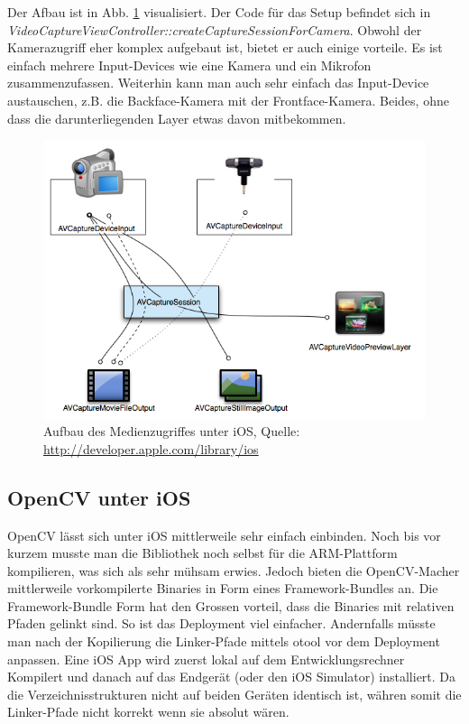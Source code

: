 Der Afbau ist in Abb. \ref{fig:ios-capture-overview} visualisiert. Der Code für das Setup befindet sich in \textit{VideoCaptureViewController::createCaptureSessionForCamera}. Obwohl der Kamerazugriff eher komplex aufgebaut ist, bietet er auch einige vorteile. Es ist einfach mehrere Input-Devices wie eine Kamera und ein Mikrofon zusammenzufassen. Weiterhin kann man auch sehr einfach das Input-Device austauschen, z.B. die Backface-Kamera mit der Frontface-Kamera. Beides, ohne dass die darunterliegenden Layer etwas davon mitbekommen.

\begin{figure}[!ht]
\centering
\includegraphics[scale=0.6]{images/ios-capture-overview.png} 
\caption{Aufbau des Medienzugriffes unter iOS, Quelle: \protect\url{http://developer.apple.com/library/ios}}
\label{fig:ios-capture-overview}
\end{figure}

\subsection{OpenCV unter iOS}
OpenCV lässt sich unter iOS mittlerweile sehr einfach einbinden. Noch bis vor kurzem musste man die Bibliothek noch selbst für die ARM-Plattform kompilieren, was sich als sehr mühsam erwies. Jedoch bieten die OpenCV-Macher mittlerweile vorkompilerte Binaries in Form eines Framework-Bundles an. Die Framework-Bundle Form hat den Grossen vorteil, dass die Binaries mit relativen Pfaden gelinkt sind. So ist das Deployment viel einfacher. Andernfalls müsste man nach der Kopilierung die Linker-Pfade mittels otool vor dem Deployment anpassen. Eine iOS App wird zuerst lokal auf dem Entwicklungsrechner Kompilert und danach auf das Endgerät (oder den iOS Simulator) installiert. Da die Verzeichnisstrukturen nicht auf beiden Geräten identisch ist, währen somit die Linker-Pfade nicht korrekt wenn sie absolut wären.

